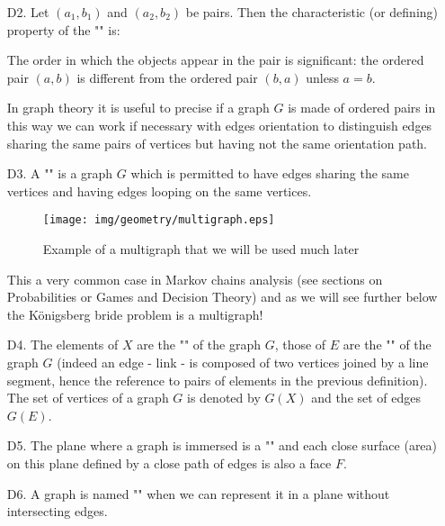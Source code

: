 {\begin{enumerate}
	\item[D2.] Let $(a_1, b_1)$ and $(a_2, b_2)$ be pairs. Then the characteristic (or defining) property of the "" is:
		
		 The order in which the objects appear in the pair is significant: the ordered pair $(a, b)$ is different from the ordered pair $(b, a)$ unless $a = b$. 
		 
		In graph theory it is useful to precise if a graph $G$ is made of ordered pairs in this way we can work if necessary with edges orientation to distinguish edges sharing the same pairs of vertices but having not the same orientation path.
	
	\item[D3.] A "" is a graph $G$ which is permitted to have edges sharing the same vertices and having edges looping on the same vertices.
	
	\begin{figure}[H]
	\centering
	\texttt{[image: img/geometry/multigraph.eps]}
	\caption{Example of a multigraph that we will be used much later}
	\end{figure}
	
	\begin{tcolorbox}[title=Remark,colframe=black,arc=10pt]
This a very common case in Markov chains analysis (see sections on Probabilities or Games and Decision Theory) and as we will see further below the Königsberg bride problem is a multigraph!
	\end{tcolorbox}	 

	\item[D4.] The elements of $X$ are the "" of the graph $G$, those of $E$ are the "" of the graph $G$ (indeed an edge - link - is composed of two vertices joined by a line segment, hence the reference to pairs of elements in the previous definition). The set of vertices of a graph $G$ is denoted by $G (X)$ and the set of edges $G (E)$.
	
	\item[D5.] The plane where a graph is immersed is a "" and each close surface (area) on this plane defined by a close path of edges is also a face $F$. 

	\item[D6.] A graph is named "" when we can represent it in a plane without intersecting edges.
	

\end{enumerate}}
